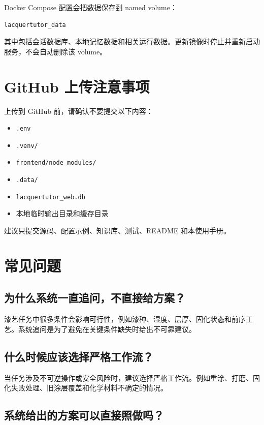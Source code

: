 \documentclass[UTF8,a4paper,12pt]{ctexart}
\begin{document}
Docker Compose 配置会把数据保存到 named volume：

\begin{lstlisting}
lacquertutor_data
\end{lstlisting}

其中包括会话数据库、本地记忆数据和相关运行数据。更新镜像时停止并重新启动服务，不会自动删除该 volume。

\section{GitHub 上传注意事项}

上传到 GitHub 前，请确认不要提交以下内容：

\begin{itemize}[leftmargin=2em]
  \item \texttt{.env}
  \item \texttt{.venv/}
  \item \texttt{frontend/node\_modules/}
  \item \texttt{.data/}
  \item \texttt{lacquertutor\_web.db}
  \item 本地临时输出目录和缓存目录
\end{itemize}

建议只提交源码、配置示例、知识库、测试、README 和本使用手册。

\section{常见问题}

\subsection{为什么系统一直追问，不直接给方案？}

漆艺任务中很多条件会影响可行性，例如漆种、湿度、层厚、固化状态和前序工艺。系统追问是为了避免在关键条件缺失时给出不可靠建议。

\subsection{什么时候应该选择严格工作流？}

当任务涉及不可逆操作或安全风险时，建议选择严格工作流。例如重涂、打磨、固化失败处理、旧涂层覆盖和化学材料不确定的情况。

\subsection{系统给出的方案可以直接照做吗？}
\end{document}
